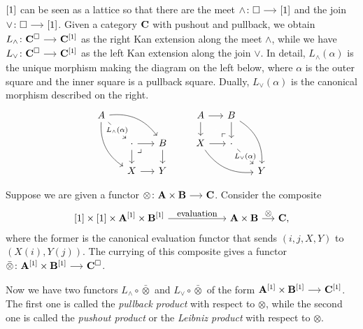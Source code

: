 \documentclass[a4paper,  dvipsnames, 11pt]{amsart}
\begin{document}
\begin{definition}
	\label{defn:LmeetLjoin}
	${\left[1\right]}$ can be seen as a lattice so that there are
	the meet $\land\colon\Box\arr\ra$ and the join $\lor\colon\Box\arr\ra$.
	Given a category $\mathbf{C}$ with pushout and pullback,
	we obtain $L_\land\colon\one{C}^\Box\arr\one{C}^\ra$ as the right Kan extension along the meet $\land$,
	while we have $L_\lor\colon\one{C}^\Box\arr\one{C}^\ra$ as the left Kan extension along the join $\lor$.
	In detail, $L_{\land}(\alpha)$ is the unique morphism making the diagram on the left below,
	where $\alpha$ is the outer square and the inner square is a pullback square.
	Dually, $L_{\lor}(\alpha)$ is the canonical morphism described on the right.
	\[
		\begin{tikzcd}[column sep=5mm, row sep=5mm]
			A
			\ar[rdd,bend right]
			\ar[rrd,bend left]
			\ar[rd,"L_\land(\alpha)"description]
				&
					&
			\\
				&
				\cdot
				\ar[r]
				\ar[d]
				\pullback[rd]
					&
					B
					\ar[d]
			\\
				&
				X
				\ar[r]
					&
					Y
		\end{tikzcd}
		\hspace{5ex}
		\begin{tikzcd}[column sep=5mm, row sep=5mm]
			A
			\ar[r]
			\ar[d]
				&
				B
				\ar[d]
				\ar[rdd,bend left]
					&
			\\
			X
			\ar[r]
			\ar[rrd,bend right]
				&
				\cdot
				\ar[rd,"L_\lor(\alpha)"{description,inner sep=.1em}]
				\pullbackR[lu]
					&
			\\
				&
					&
					Y
		\end{tikzcd}
	\]
\end{definition}
\begin{definition}
	Suppose we are given a functor $\otimes\colon\one{A}\times\one{B}\arr\one{C}$.
	Consider the composite
	\[
		\ra\times\ra\times\one{A}^\ra\times\one{B}^\ra
		\arr"\text{evaluation}"[][6]
		\one{A}\times\one{B}
		\arr"\otimes"
		\one{C}\text{,}
	\]
	where the former is the canonical evaluation functor that sends $(i,j,X,Y)$ to $(X(i),Y(j))$.
	The currying of this composite gives a functor $\bar\otimes\colon\one{A}^\ra\times\one{B}^\ra\arr\one{C}^\Box$.

	Now we have two functors $L_\land\circ\bar\otimes$ and $L_\lor\circ\bar\otimes$ of the form $\one{A}^\ra\times\one{B}^\ra\arr\one{C}^\ra$.
	The first one is called the \textit{pullback product} with respect to $\otimes$,
	while the second one is called the \textit{pushout product} or the \textit{Leibniz product} with respect to $\otimes$.
\end{definition}
\end{document}

